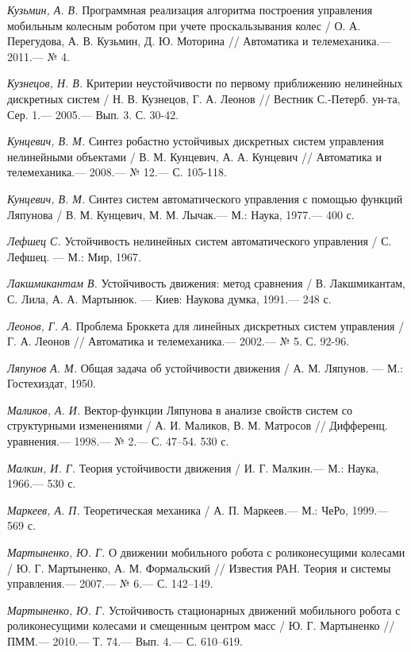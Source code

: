 \begin{thebibliography}{10}
	{\it Кузьмин, А. В.} Программная реализация алгоритма построения управления мобильным колесным роботом при учете проскальзывания колес / О. А. Перегудова, А. В. Кузьмин, Д. Ю. Моторина // Автоматика и телемеханика.—  2011.— № 4.
	
	{\it Кузнецов, Н. В.} Критерии неустойчивости по первому приближению нелинейных дискретных систем / Н. В. Кузнецов, Г. А. Леонов // Вестник С.-Петерб. ун-та, Сер. 1.—  2005.— Вып. 3. С. 30-42.
	
	{\it Кунцевич, В. М.} Синтез робастно устойчивых дискретных систем управления нелинейными объектами
	/ В. М. Кунцевич, А. А. Кунцевич // Автоматика и телемеханика.— 2008.— № 12.— С. 105-118.
	
	{\it Кунцевич, В. М.} Синтез систем автоматического управления с помощью функций
	Ляпунова / В. М. Кунцевич, М. М. Лычак.— М.: Наука, 1977.— 400 с.
	
	{\it Лефшец С.} Устойчивость нелинейных систем автоматического управления /
	С. Лефшец. — М.: Мир, 1967.
	
	{\it Лакшмикантам В.} Устойчивость движения: метод сравнения / В. Лакшмикантам, С. Лила, А. А. Мартынюк. — Киев: Наукова думка, 1991.— 248 с.
	
	{\it Леонов, Г. А.} Проблема Броккета для линейных дискретных систем управления / Г. А. Леонов // Автоматика и телемеханика.—  2002.— № 5. С. 92-96.
	
	{\it Ляпунов А. М.} Общая задача об устойчивости движения /
	А. М. Ляпунов. — М.: Гостехиздат, 1950.
	
	{\it Маликов, А. И.} Вектор-функции Ляпунова в анализе свойств систем со структурными изменениями / А. И. Маликов, В. М. Матросов // Дифференц. уравнения.— 1998.— № 2.— С. 47–54.
	530 с.
	
	{\it Малкин, И. Г.} Теория устойчивости движения / И. Г. Малкин.— М.: Наука, 1966.—
	530 с.
	
	{\it Маркеев, А. П.} Теоретическая механика / А. П. Маркеев.— М.: ЧеРо, 1999.— 569 с.
	
	{\it Мартыненко, Ю. Г.} О движении мобильного робота с роликонесущими колесами / Ю. Г. Мартыненко, А. М. Формальский  //
	Известия РАН. Теория и системы управления.— 2007.— № 6.— С. 142–149.
	
	
	{\it Мартыненко, Ю. Г.} Устойчивость стационарных движений мобильного робота с роликонесущими колесами и смещенным центром масс / Ю. Г. Мартыненко //
	ПММ.— 2010.— Т. 74.— Вып. 4.— С. 610–619.
	

\end{thebibliography}
